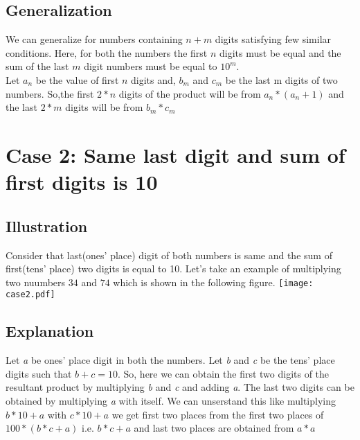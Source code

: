 \documentclass{article}
\begin{document}
\subsection{Generalization}
\hspace{3mm} We can generalize for numbers containing $n+m$ digits satisfying few similar conditions. Here, for both
the numbers the first $n$ digits must be equal and the sum of the last $m$ digit numbers must be
equal to $10^m$.\\
\hspace{3mm} Let $a_{n}$ be the value of first $n$ digits and, $b_{m}$ and $c_{m}$ be the last m digits of two numbers. So,the first $2*n$ digits of the product will be from $a_{n}*(a_{n}+1)$ and the last $2*m$ digits will be from $b_{m}*c_{m}$
\section{\Large{Case 2:\cite{vedanta} }\large{Same last digit and sum of first digits is 10}}
\subsection{\large{Illustration}}
\hfill Consider that last(ones' place) digit of both numbers is same
and the sum of first(tens' place) two digits is equal to 10.
Let's take an example of multiplying two nuumbers $34$ and $74$ which is shown in the following figure.
\hfill \break
\texttt{[image: case2.pdf]}

\subsection{\large{Explanation}}\label{ssec:exp2}
\hspace{3mm} Let \textit{a} be ones' place digit in both the numbers.
Let \textit{b} and \textit{c} be the tens' place digits such that $b + c = 10$. 
So, here we can obtain the first two digits of the resultant product by multiplying \textit{b} and \textit{c} and adding \textit{a}.
The last two digits can be obtained by multiplying \textit{a} with itself. We can unserstand this like multiplying $b*10+a$ with $c*10+a$ we get first two places
from the first two places of $100*(b*c+a)$ i.e. $b*c+a$ and last two places are obtained from $a*a$
\end{document}
